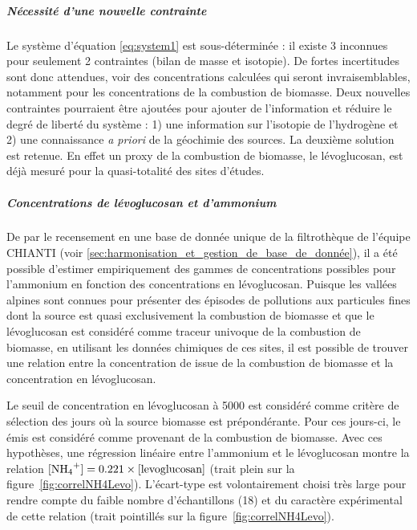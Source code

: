 \subparagraph{Nécessité d'une nouvelle contrainte}%
\label{par:nécessité_d_une_nouvelle_contrainte}

Le système d'équation \ref{eq:system1} est sous-déterminée : il existe 3 inconnues pour
seulement 2 contraintes (bilan de masse et isotopie). De fortes incertitudes sont donc
attendues, voir des concentrations calculées qui seront invraisemblables, notamment pour les
concentrations de la combustion de biomasse.
Deux nouvelles contraintes pourraient être ajoutées pour ajouter de l'information et
réduire le degré de liberté du système : 1) une information sur l'isotopie de l'hydrogène
et 2) une connaissance \textit{a priori} de la géochimie des sources.  La deuxième
solution est retenue.  En effet un proxy de la combustion de biomasse, le lévoglucosan,
est déjà mesuré pour la quasi-totalité des sites d'études.

\subparagraph{Concentrations de lévoglucosan et d'ammonium}%
\label{par:concentrations_de_lévoglucosan_et_d_ammonium}

De par le recensement en une base de donnée unique de la filtrothèque de l'équipe
CHIANTI (voir \ref{sec:harmonisation_et_gestion_de_base_de_donnée}), il a été possible
d'estimer empiriquement des gammes de concentrations possibles pour l'ammonium en fonction
des concentrations en lévoglucosan. Puisque les vallées alpines sont connues pour présenter
des épisodes de pollutions aux particules fines dont la source est quasi exclusivement
la combustion de biomasse \autocite{piotAtmospheric2011,gollyEtude2014} et que le lévoglucosan
est considéré comme traceur univoque de la combustion de biomasse, en utilisant les
données chimiques de ces sites, il est possible de trouver une relation entre la
concentration de \NHq{} issue de la combustion de biomasse et la concentration en
lévoglucosan. 

Le seuil de concentration en lévoglucosan à \SI{5000}{\ngm} est considéré comme critère de
sélection des jours où la source biomasse est prépondérante. 
Pour ces jours-ci, le \NHq{} émis est considéré comme provenant de la combustion de
biomasse.
Avec ces hypothèses, une régression linéaire entre l'ammonium et le lévoglucosan montre la
relation $[\NHq] = 0.221 \times \text{[levoglucosan]}$ (trait plein sur la
figure~\ref{fig:correlNH4Levo}).
L'écart-type est volontairement choisi très large pour rendre compte du faible nombre
d'échantillons (18) et du caractère expérimental de cette relation (trait pointillés sur la
figure~\ref{fig:correlNH4Levo}).

